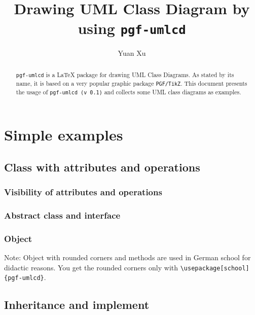 \documentclass{article}
\newcommand{\demo}[2][1]{
\begin{minipage}{.49\linewidth}
\centering
\resizebox{#1\linewidth}{!}{

}
\end{minipage}
\hspace{0.01\linewidth}
\begin{minipage}{.5\linewidth}

\end{minipage}
}
\begin{document}
\title{Drawing UML Class Diagram by using \texttt{pgf-umlcd}}
\author{Yuan Xu}
\maketitle

\begin{abstract}
  \texttt{pgf-umlcd} is a LaTeX package for drawing UML Class
  Diagrams. As stated by its name, it is based on a very popular
  graphic package \texttt{PGF/TikZ}. This document presents the usage
  of \texttt{pgf-umlcd (v 0.1)} and collects some UML class diagrams as
  examples.
\end{abstract}

\tableofcontents

\section{Simple examples}
\subsection{Class with attributes and operations}
\demo{class}

\subsubsection{Visibility of attributes and operations}
\demo[0.8]{visibility}

\subsubsection{Abstract class and interface}
\demo[0.5]{abstract-class}
\demo[0.5]{interface}

\subsubsection{Object}
Note: Object with rounded corners and methods are used in German school for didactic reasons. You get the rounded corners only with \lstinline|\usepackage[school]{pgf-umlcd}|.\\
\demo[0.5]{object}
\demo[0.5]{object-include-methods}

\subsection{Inheritance and implement}
\end{document}
